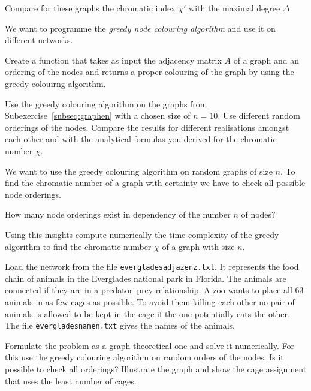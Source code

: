 Compare for these graphs the chromatic index  $\chi'$  with the maximal degree $\Delta$.

\exercise[%
  topic = Coding the Greedy Colouring
    ]

We want to programme the \emph{greedy node colouring algorithm} and use it on different networks.

\subexercise[%
  topic=Greedy Colouring,
    ]
    
    
    Create a function that takes as input the adjacency matrix $A$ of a graph and an ordering of the nodes and returns a proper colouring of the graph by using the greedy colouirng algorithm. 
    

\subexercise[%
  topic=Greedy Coloruing of Graph Models,
    ]
    
Use the greedy colouring algorithm on the graphs from Subexercise~\ref{subseq:graphen} with a chosen size of $n=10$. Use different random orderings of the nodes. Compare the results for different realisations amongst each other and with the analytical formulas you derived for the chromatic number $\chi$.
    
   
		
		
		\subexercise[%
  topic=Time Complexity of the Greedy Colouring Algorithm,
    ]

We want to use the greedy colouring algorithm on random graphs of size $n$. To find the chromatic number of a graph with certainty we have to check all possible node orderings. 

How many node orderings exist in dependency of the number $n$ of nodes? 

Using this insights compute numerically the time complexity of the greedy algorithm to find the chromatic number $\chi$ of a graph with size $n$.


\exercise[%
  topic=Placing Animals in Cages ,
    ]



Load the network from the file  {\tt everglades\textunderscore adjazenz.txt}. It represents the food chain of animals in the Everglades national park in Florida. The animals are connected if they are in a predator--prey relationship. A zoo wants to place all $63$ animals in as few cages as possible. To avoid them killing each other no pair of animals is allowed to be kept in the cage if the one potentially eats the other. The file  {\tt everglades\textunderscore namen.txt} gives the names of the animals.

Formulate the problem as a graph theoretical one and solve it numerically. For this use the greedy colouring algorithm on random orders of the nodes. Is it possible to check all orderings? Illustrate the graph and show the cage assignment that uses the least number of cages.

